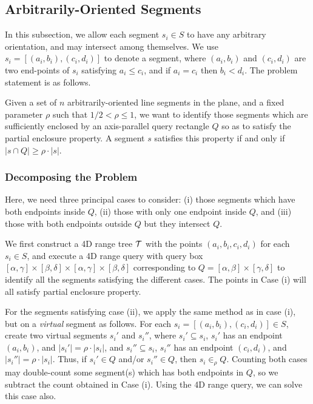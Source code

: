 \subsection{Arbitrarily-Oriented Segments}
\label{:rectangles:ao}

In this subsection, we allow each segment $s_i \in S$ to have any 
arbitrary orientation, and may intersect among themselves. We use 
$s_i= [(a_i,b_i), (c_i,d_i)]$ to denote a segment, where $(a_i,b_i)$ 
and $(c_i,d_i)$ are two end-points of $s_i$ satisfying $a_i\leq c_i$, 
and if $a_i = c_i$ then $b_i < d_i$. The problem statement is as 
follows.

\begin{problem}
Given a set of $n$ arbitrarily-oriented line segments in the plane, and a 
fixed parameter $\rho$ such that $1/2 < \rho \leq 1$, we want to identify 
those segments which are sufficiently enclosed by an axis-parallel query 
rectangle $Q$ so as to satisfy the partial enclosure property. A segment 
$s$ satisfies this property if and only if $|s \cap Q| \geq \rho \cdot |s|$.
\end{problem}



\subsubsection{Decomposing the Problem}
\label{:rectangles:ao:approach}

Here, we need three principal cases to consider: (i) those segments which 
have both endpoints inside $Q$, (ii) those with only one endpoint inside 
$Q$, and (iii) those with both endpoints outside $Q$ but they intersect $Q$.  

We first construct a 4D range tree $\cal T$ with the points $(a_i, b_i, c_i, d_i)$ 
for each $s_i \in S$, and execute a 4D range query with query box 
$[\alpha, \gamma] \times [\beta, \delta] \times [\alpha, \gamma] \times 
[\beta, \delta]$ corresponding to $Q=[\alpha,\beta] \times [\gamma,\delta]$ 
to identify all the segments satisfying the different cases. The points in Case (i)
will all satisfy partial enclosure property.

For the segments satisfying case (ii), we apply the same method as in 
case (i), but on a {\it virtual} segment as follows. For each $s_i=
[(a_i,b_i),(c_i,d_i)] \in S$, create two virtual segments $s_i'$ and 
$s_i''$, where $s_i' \subseteq s_i$, $s_i'$ has an endpoint $(a_i,b_i)$, 
and $|s_i'| = \rho \cdot |s_i|$, and $s_i'' \subseteq s_i$, $s_i''$ 
has an endpoint $(c_i,d_i)$, and $|s_i''| = \rho \cdot |s_i|$. Thus, if 
$s_i' \in Q$ and/or $s_i'' \in Q$, then $s_i \in_\rho Q$. Counting both 
cases may double-count some 
segment(s) which has both endpoints in $Q$, so we subtract the count 
obtained in Case (i). Using the 4D range query, we can solve this case 
also.

